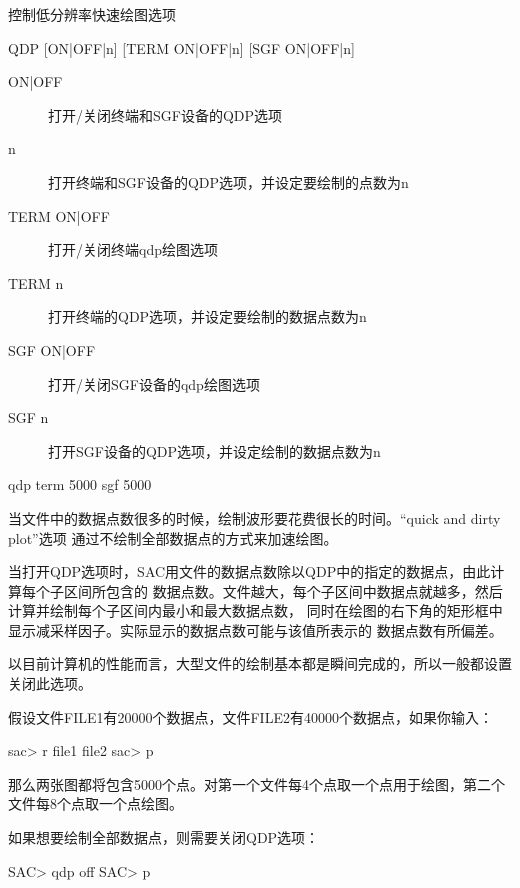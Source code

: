 \label{cmd:qdp}

控制低分辨率快速绘图选项

\begin{SACSTX}
QDP [ON|OFF|n] [TERM ON|OFF|n] [SGF ON|OFF|n]
\end{SACSTX}

\begin{description}
\item [ON|OFF] 打开/关闭终端和SGF设备的QDP选项
\item [n] 打开终端和SGF设备的QDP选项，并设定要绘制的点数为n
\item [TERM ON|OFF] 打开/关闭终端qdp绘图选项
\item [TERM n] 打开终端的QDP选项，并设定要绘制的数据点数为n
\item [SGF ON|OFF] 打开/关闭SGF设备的qdp绘图选项
\item [SGF n] 打开SGF设备的QDP选项，并设定绘制的数据点数为n
\end{description}

\begin{SACDFT}
qdp term 5000 sgf 5000
\end{SACDFT}

当文件中的数据点数很多的时候，绘制波形要花费很长的时间。``quick and dirty plot''选项
通过不绘制全部数据点的方式来加速绘图。

当打开QDP选项时，SAC用文件的数据点数除以QDP中的指定的数据点，由此计算每个子区间所包含的
数据点数。文件越大，每个子区间中数据点就越多，然后计算并绘制每个子区间内最小和最大数据点数，
同时在绘图的右下角的矩形框中显示减采样因子。实际显示的数据点数可能与该值所表示的
数据点数有所偏差。

以目前计算机的性能而言，大型文件的绘制基本都是瞬间完成的，所以一般都设置关闭此选项。

假设文件FILE1有20000个数据点，文件FILE2有40000个数据点，如果你输入：
\begin{SACCode}
sac> r file1 file2
sac> p
\end{SACCode}
那么两张图都将包含5000个点。对第一个文件每4个点取一个点用于绘图，第二个文件每8个点取一个点绘图。

如果想要绘制全部数据点，则需要关闭QDP选项：
\begin{SACCode}
SAC> qdp off
SAC> p
\end{SACCode}
